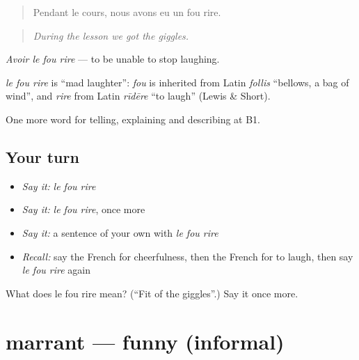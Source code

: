 \begin{quote}
Pendant le cours, nous avons eu un fou rire.
\end{quote}

\begin{quote}
\emph{During the lesson we got the giggles.}
\end{quote}

\emph{Avoir le fou rire} — to be unable to stop laughing.

\begin{cousinweb}
\emph{le fou rire} is \textquotedblleft{}mad laughter\textquotedblright{}: \emph{fou} is inherited from Latin \emph{follis} \textquotedblleft{}bellows, a bag of wind\textquotedblright{}, and \emph{rire} from Latin \emph{rīdēre} \textquotedblleft{}to laugh\textquotedblright{} (Lewis \& Short).
\end{cousinweb}

\begin{grammarlens}[title={What you've built}]
One more word for telling, explaining and describing at B1.
\end{grammarlens}

\subsection*{Your turn}
\begin{itemize}
\raggedright
  \item \emph{Say it:} \emph{le fou rire}
  \item \emph{Say it:} \emph{le fou rire}, once more
  \item \emph{Say it:} a sentence of your own with \emph{le fou rire}
  \item \emph{Recall:} say the French for cheerfulness, then the French for to laugh, then say \emph{le fou rire} again
\end{itemize}

\begin{tcolorbox}[breakable,colback=teal!4,colframe=teal!35!black,title={Before you move on}]
What does le fou rire mean? (\textquotedblleft{}Fit of the giggles\textquotedblright{}.) Say it once more.
\end{tcolorbox}
\section[marrant]{marrant — funny (informal)}

\label{lesson:FR-C474-marrant}



